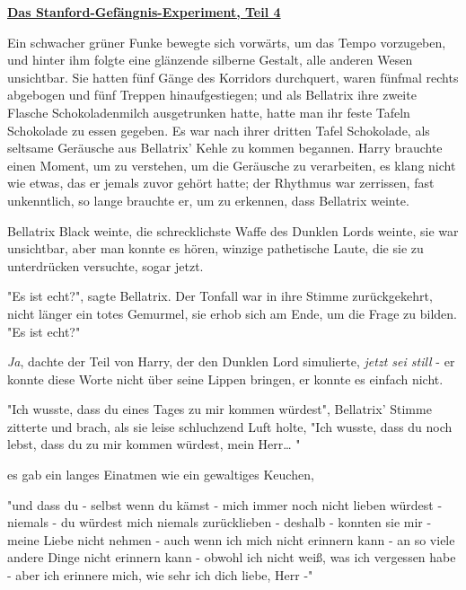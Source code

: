

\hypertarget{das-stanford-gefuxe4ngnis-experiment-teil-4}{%

\textbf{\uline{Das Stanford-Gefängnis-Experiment, Teil 4}}

Ein schwacher grüner Funke bewegte sich vorwärts, um das Tempo vorzugeben, und hinter ihm folgte eine glänzende silberne Gestalt, alle anderen Wesen unsichtbar. Sie hatten fünf Gänge des Korridors durchquert, waren fünfmal rechts abgebogen und fünf Treppen hinaufgestiegen; und als Bellatrix ihre zweite Flasche Schokoladenmilch ausgetrunken hatte, hatte man ihr feste Tafeln Schokolade zu essen gegeben. Es war nach ihrer dritten Tafel Schokolade, als seltsame Geräusche aus Bellatrix' Kehle zu kommen begannen. Harry brauchte einen Moment, um zu verstehen, um die Geräusche zu verarbeiten, es klang nicht wie etwas, das er jemals zuvor gehört hatte; der Rhythmus war zerrissen, fast unkenntlich, so lange brauchte er, um zu erkennen, dass Bellatrix weinte.

Bellatrix Black weinte, die schrecklichste Waffe des Dunklen Lords weinte, sie war unsichtbar, aber man konnte es hören, winzige pathetische Laute, die sie zu unterdrücken versuchte, sogar jetzt.

"Es ist echt?", sagte Bellatrix. Der Tonfall war in ihre Stimme zurückgekehrt, nicht länger ein totes Gemurmel, sie erhob sich am Ende, um die Frage zu bilden. "Es ist echt?"

\emph{Ja}, dachte der Teil von Harry, der den Dunklen Lord simulierte, \emph{jetzt sei still} - er konnte diese Worte nicht über seine Lippen bringen, er konnte es einfach nicht.

"Ich wusste, dass du eines Tages zu mir kommen würdest", Bellatrix' Stimme zitterte und brach, als sie leise schluchzend Luft holte, "Ich wusste, dass du noch lebst, dass du zu mir kommen würdest, mein Herr… "

es gab ein langes Einatmen wie ein gewaltiges Keuchen,

"und dass du - selbst wenn du kämst - mich immer noch nicht lieben würdest - niemals - du würdest mich niemals zurücklieben - deshalb - konnten sie mir - meine Liebe nicht nehmen - auch wenn ich mich nicht erinnern kann - an so viele andere Dinge nicht erinnern kann - obwohl ich nicht weiß, was ich vergessen habe - aber ich erinnere mich, wie sehr ich dich liebe, Herr -"

}
